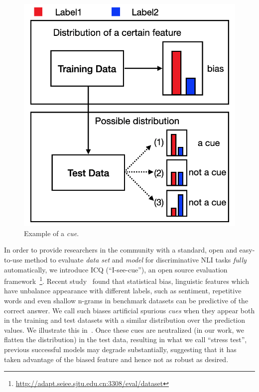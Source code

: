 \begin{figure}[th]
\centering
\includegraphics[width=0.6\columnwidth]{picture/cue_def.png}
\caption{Example of a {\em cue}.}
\label{fig:cue_def}
\end{figure}

In order to provide researchers in the community with a standard, open and easy-to-use method
to evaluate {\em data set} and {\em model} for
discriminative NLI tasks {\em fully} automatically, we introduce ICQ (``I-see-cue''), 
an open source evaluation framework~\footnote{\url{http://adapt.seiee.sjtu.edu.cn:3308/eval/dataset}}.
Recent study~\cite{gururangan2018annotation,sanchez2018behavior,poliak2018hypothesis} 
found that 
statistical bias, linguistic features which have unbalance appearance with different labels, such as 
sentiment, repetitive words and even shallow n-grams in 
benchmark datasets can be predictive of the correct 
answer. We call such biases artificial spurious \textit{cues} when
they appear both in the training and test datasets with a similar distribution
over the prediction values.
We illustrate this in~. 
Once these cues are neutralized (in our work, we flatten the distribution) in the test data, 
resulting in what we call ``stress test'',
previous successful models may degrade substantially, suggesting 
that it has taken advantage of the biased feature and hence not as robust as desired.

